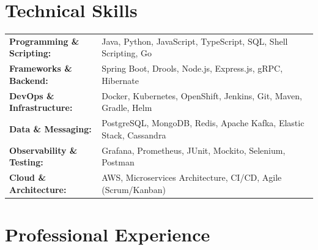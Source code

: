 \section{Technical Skills}
        \vspace{-14pt}
        \begin{table}[h]
            \fontsize{9pt}{10pt}\selectfont
            \begin{tabular}{p{0.3\linewidth} p{0.7\linewidth}}
                \textbf{Programming \& Scripting:} & Java, Python, JavaScript, TypeScript, SQL, Shell Scripting, Go \\
                \textbf{Frameworks \& Backend:} & Spring Boot, Drools, Node.js, Express.js, gRPC, Hibernate \\
                \textbf{DevOps \& Infrastructure:} & Docker, Kubernetes, OpenShift, Jenkins, Git, Maven, Gradle, Helm \\
                \textbf{Data \& Messaging:} & PostgreSQL, MongoDB, Redis, Apache Kafka, Elastic Stack, Cassandra \\
                \textbf{Observability \& Testing:} & Grafana, Prometheus, JUnit, Mockito, Selenium, Postman \\
                \textbf{Cloud \& Architecture:} & AWS, Microservices Architecture, CI/CD, Agile (Scrum/Kanban) \\
            \end{tabular}
        \end{table}
    \vspace{-15pt}

\section{Professional Experience}
  \resumeSubHeadingListStart


